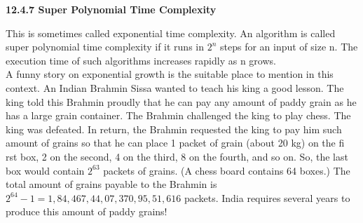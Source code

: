 \documentclass[9pt]{beamer}
\begin{document}
\begin{frame}
\large{
\textbf{12.4.7 Super Polynomial Time Complexity}\\
}

\vspace*{0.2cm}
\small{
This is sometimes called exponential time complexity. An algorithm is called super polynomial time
complexity if it runs in $2^{n}$ steps for an input of size n. The execution time of such algorithms increases
rapidly as n grows.\\
\hspace*{0.5cm} A funny story on exponential growth is the suitable place to mention in this context. An Indian
Brahmin Sissa wanted to teach his king a good lesson. The king told this Brahmin proudly that he can
pay any amount of paddy grain as he has a large grain container. The Brahmin challenged the king to
play chess. The king was defeated. In return, the Brahmin requested the king to pay him such amount of
grains so that he can place 1 packet of grain (about 20 kg) on the fi rst box, 2 on the second, 4 on the third,
8 on the fourth, and so on. So, the last box would contain $2^{63}$ packets of grains. (A chess board contains
64 boxes.) The total amount of grains payable to the Brahmin is $2^{64} - 1 = 1, 84, 467, 44, 07, 370, 95, 51,
616$ packets. India requires several years to produce this amount of paddy grains!\\
}
\end{frame}
\end{document}
